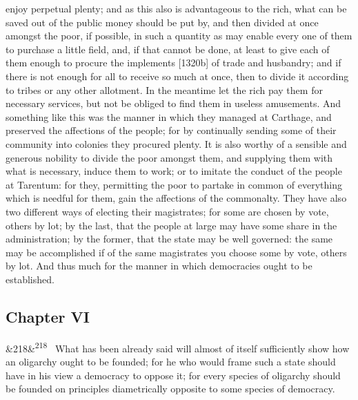 \documentclass[12pt]{article}
\newcommand{\para}[1][]{\par\noindent\ifx&#1&\else\textsuperscript{\footnotesize #1}~\fi}
\begin{document}
enjoy perpetual plenty; and as this also is advantageous to the rich, what can be saved out of the public money should be put by, and then divided at once amongst the poor, if possible, in such a quantity as may enable every one of them to purchase a little field, and, if that cannot be done, at least to give each of them enough to procure the implements [1320b] of trade and husbandry; and if there is not enough for all to receive so much at once, then to divide it according to tribes or any other allotment. In the meantime let the rich pay them for necessary services, but not be obliged to find them in useless amusements. And something like this was the manner in which they managed at Carthage, and preserved the affections of the people; for by continually sending some of their community into colonies they procured plenty. It is also worthy of a sensible and generous nobility to divide the poor amongst them, and supplying them with what is necessary, induce them to work; or to imitate the conduct of the people at Tarentum: for they, permitting the poor to partake in common of everything which is needful for them, gain the affections of the commonalty. They have also two different ways of electing their magistrates; for some are chosen by vote, others by lot; by the last, that the people at large may have some share in the administration; by the former, that the state may be well governed: the same may be accomplished if of the same magistrates you choose some by vote, others by lot. And thus much for the manner in which democracies ought to be established.

\subsection*{Chapter VI}

\para[218] What has been already said will almost of itself sufficiently show how an oligarchy ought to be founded; for he who would frame such a state should have in his view a democracy to oppose it; for every species of oligarchy should be founded on principles diametrically opposite to some species of democracy.
\end{document}
